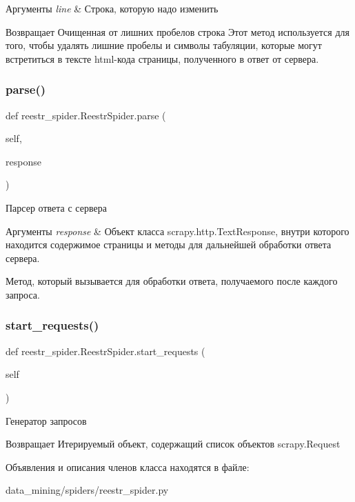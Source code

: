 \begin{DoxyParams}{Аргументы}
{\em line} & Строка, которую надо изменить \\
\hline
\end{DoxyParams}
\begin{DoxyReturn}{Возвращает}
Очищенная от лишних пробелов строка Этот метод используется для того, чтобы удалять лишние пробелы и символы табуляции, которые могут встретиться в тексте html-\/кода страницы, полученного в ответ от сервера. 
\end{DoxyReturn}
\mbox{\label{classreestr__spider_1_1ReestrSpider_a1995683a0087b22c906ea7806c1cb3d7}} 
\subsubsection{\texorpdfstring{parse()}{parse()}}
{\footnotesize\ttfamily def reestr\+\_\+spider.\+Reestr\+Spider.\+parse (\begin{DoxyParamCaption}\item[{}]{self,  }\item[{}]{response }\end{DoxyParamCaption})}



Парсер ответа с сервера 


\begin{DoxyParams}{Аргументы}
{\em response} & Объект класса scrapy.\+http.\+Text\+Response, внутри которого находится содержимое страницы и методы для дальнейшей обработки ответа сервера.\\
\hline
\end{DoxyParams}
Метод, который вызывается для обработки ответа, получаемого после каждого запроса. \mbox{\label{classreestr__spider_1_1ReestrSpider_aefeae36f75466e6df09087955be618ff}} 
\subsubsection{\texorpdfstring{start\+\_\+requests()}{start\_requests()}}
{\footnotesize\ttfamily def reestr\+\_\+spider.\+Reestr\+Spider.\+start\+\_\+requests (\begin{DoxyParamCaption}\item[{}]{self }\end{DoxyParamCaption})}



Генератор запросов 

\begin{DoxyReturn}{Возвращает}
Итерируемый объект, содержащий список объектов scrapy.\+Request 
\end{DoxyReturn}


Объявления и описания членов класса находятся в файле\+:\begin{DoxyCompactItemize}
\item 
data\+\_\+mining/spiders/reestr\+\_\+spider.\+py\end{DoxyCompactItemize}
